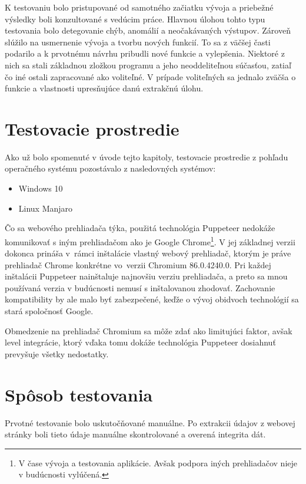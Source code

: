 K testovaniu bolo pristupované od samotného začiatku vývoja a priebežné výsledky boli konzultované s vedúcim práce. Hlavnou úlohou tohto typu testovania bolo detegovanie chýb, anomálií a neočakávaných výstupov. Zároveň slúžilo na usmernenie vývoja a tvorbu nových funkcií. To sa z väčšej časti podarilo a k prvotnému návrhu pribudli nové funkcie a vylepšenia. Niektoré z nich sa stali základnou zložkou programu a jeho neoddeliteľnou súčasťou, zatiaľ čo iné ostali zapracované ako voliteľné. V prípade voliteľných sa jednalo zväčša o funkcie a vlastnosti upresňujúce danú extrakčnú úlohu.

\section{Testovacie prostredie}

Ako už bolo spomenuté v úvode tejto kapitoly, testovacie prostredie z pohľadu operačného systému pozostávalo z nasledovných systémov:

\begin{itemize}
    \item Windows 10
    \item Linux Manjaro
\end{itemize}

\newpage

Čo sa webového prehliadača týka, použitá technológia Puppeteer nedokáže komunikovať s iným prehliadačom ako je Google Chrome\footnote{V čase vývoja a testovania aplikácie. Avšak podpora iných prehliadačov nieje v budúcnosti vylúčená.}. V jej základnej verzii dokonca prináša v~rámci inštalácie vlastný webový prehliadač, ktorým je práve prehliadač Chrome konkrétne vo~verzii Chromium 86.0.4240.0. Pri každej inštalácii Puppeteer nainštaluje najnovšiu verziu prehliadača, a preto sa mnou používaná verzia v budúcnosti nemusí s inštalovanou zhodovať. Zachovanie kompatibility by ale malo byť zabezpečené, keďže o vývoj obidvoch technológií sa stará spoločnosť Google.

Obmedzenie na prehliadač Chromium sa môže zdať ako limitujúci faktor, avšak level integrácie, ktorý vďaka tomu dokáže technológia Puppeteer dosiahnuť prevyšuje všetky nedostatky.

\section{Spôsob testovania}
\label{sposobytestu}

Prvotné testovanie bolo uskutočňované manuálne. Po extrakcii údajov z webovej stránky boli tieto údaje manuálne skontrolované a overená integrita dát. 

